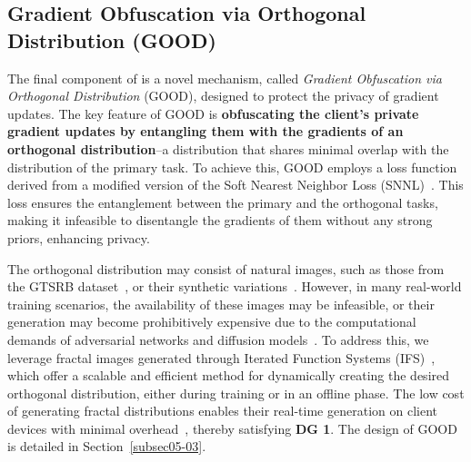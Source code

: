 \subsection{Gradient Obfuscation via Orthogonal Distribution (GOOD)} 
\label{subsec04-03}
The final component of \sysname is a novel mechanism, called {\it Gradient Obfuscation via Orthogonal Distribution} (GOOD), designed to protect the privacy of gradient updates. The key feature of GOOD is \textbf{obfuscating the client's private gradient updates by entangling them with the gradients of an orthogonal distribution}--a distribution that shares minimal overlap with the distribution of the primary task. To achieve this, GOOD employs a loss function derived from a modified version of the Soft Nearest Neighbor Loss (SNNL)~\cite{FroPapHin19}. This loss ensures the entanglement between the primary and the orthogonal tasks, making it infeasible to disentangle the gradients of them without any strong priors, enhancing privacy.

The orthogonal distribution may consist of natural images, such as those from the GTSRB dataset~\cite{stallkamp2012man}, or their synthetic variations~\cite{synthImages}. However, in many real-world training scenarios, the availability of these images may be infeasible, or their generation may become prohibitively expensive due to the computational demands of adversarial networks and diffusion models~\cite{ulhaq2022efficient,chen2024opportunities}. To address this, we leverage fractal images generated through Iterated Function Systems (IFS)~\cite{AndFar22}, which offer a scalable and efficient method for dynamically creating the desired orthogonal distribution, either during training or in an offline phase. The low cost of generating fractal distributions enables their real-time generation on client devices with minimal overhead~\cite{chu2000fast,brown2010highly}, thereby satisfying \textbf{DG 1}. The design of GOOD is detailed in Section~\ref{subsec05-03}.
